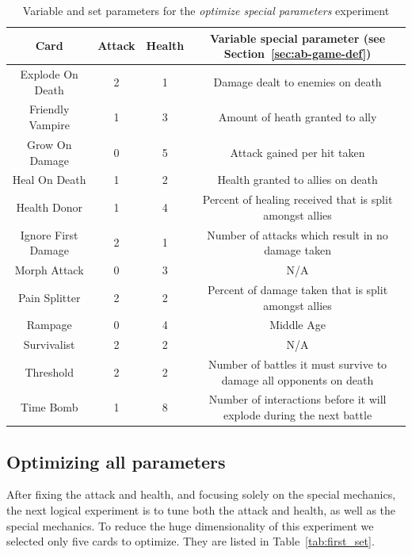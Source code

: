 \begin{table}[t]
\centering
\begin{tabular}{||c c c c||} 
 \hline
 Card & Attack & Health & Variable special parameter (see Section~\ref{sec:ab-game-def})\\ [0.5ex] 
 \hline\hline
 Explode On Death & 2 & 1 & Damage dealt to enemies on death \\ 
 \hline
 Friendly Vampire & 1 & 3 & Amount of heath granted to ally \\
 \hline
 Grow On Damage & 0 & 5 & Attack gained per hit taken \\
 \hline
 Heal On Death & 1 & 2 & Health granted to allies on death \\
 \hline
 Health Donor & 1 & 4 & Percent of healing received that is split amongst allies \\
 \hline
 Ignore First Damage & 2 & 1 & Number of attacks which result in no damage taken \\
 \hline
 Morph Attack & 0 & 3 & N/A \\
 \hline
 Pain Splitter & 2 & 2 & Percent of damage taken that is split amongst allies \\
 \hline
 Rampage & 0 & 4 & Middle Age  \\
 \hline
 Survivalist & 2 & 2 & N/A \\
 \hline
 Threshold & 2 & 2 & Number of battles it must survive to damage all opponents on death \\
 \hline
 Time Bomb & 1 & 8 & Number of interactions before it will explode during the next battle \\ 
 \hline
\end{tabular}
\caption{Variable and set parameters for the \textit{optimize special parameters} experiment}
\label{tab:special_cards}
\end{table}

\subsection{Optimizing all parameters} \label{sec:first_set}

After fixing the attack and health, and focusing solely on the special mechanics, the next logical experiment is to tune both the attack and health, as well as the special mechanics. To reduce the huge dimensionality of this experiment we selected only five cards to optimize. They are listed in Table~\ref{tab:first_set}.

